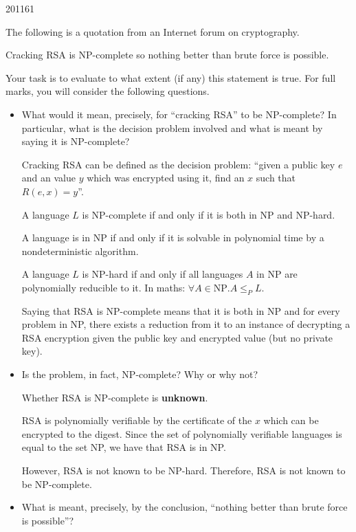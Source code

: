 \documentclass[10pt,\jkfside,a4paper]{article}
\begin{document}
\begin{examquestion}{2011}{6}{1}

The following is a quotation from an Internet forum on cryptography.

\hspace{2em} Cracking RSA is NP-complete so nothing better than brute force is
possible.

Your task is to evaluate to what extent (if any) this statement is true. For full
marks, you will consider the following questions.

\begin{itemize}

\item What would it mean, precisely, for ``cracking RSA'' to be NP-complete?
In particular, what is the decision problem involved and what is meant by
saying it is NP-complete?

Cracking RSA can be defined as the decision problem: ``given a public key
$e$ and an value $y$ which was encrypted using it, find an $x$ such that
$R(e, x) = y$''.

A language $L$ is NP-complete if and only if it is both in NP and NP-hard.

A language is in NP if and only if it is solvable in polynomial time by a
nondeterministic algorithm.

A language $L$ is NP-hard if and only if all languages $A$ in NP are
polynomially reducible to it. In maths: $\forall A \in \text{NP}. A \le_P L$.

Saying that RSA is NP-complete means that it is both in NP and for every
problem in NP, there exists a reduction from it to an instance of decrypting
a RSA encryption given the public key and encrypted value (but no private key).

\item Is the problem, in fact, NP-complete? Why or why not?

Whether RSA is NP-complete is \textbf{unknown}.

RSA is polynomially verifiable by the certificate of the $x$ which can be
encrypted to the digest. Since the set of polynomially verifiable languages
is equal to the set NP, we have that RSA is in NP\@.

However, RSA is not known to be NP-hard. Therefore, RSA is not known to be
NP-complete.

\item What is meant, precisely, by the conclusion, ``nothing better than brute
force is possible''?


\end{itemize}
\end{examquestion}
\end{document}
